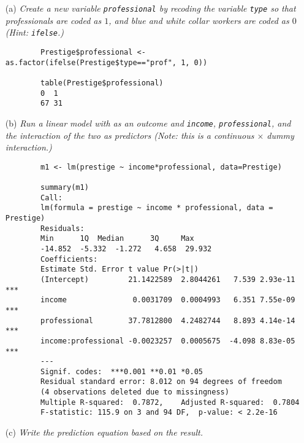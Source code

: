 \documentclass[12pt,letterpaper]{article}
\begin{document}
	\newpage
	\begin{enumerate}
		
		\item [(a)]
		\textit{Create a new variable \texttt{professional} by recoding the variable \texttt{type} so that professionals are coded as $1$, and blue and white collar workers are coded as $0$ (Hint: \texttt{ifelse}.)}
		
		
		\begin{verbatim}
		Prestige$professional <- as.factor(ifelse(Prestige$type=="prof", 1, 0))
		
		table(Prestige$professional)
		0  1 
		67 31 
		\end{verbatim}
		
				 		\vspace{1cm}
		
		\item [(b)]
		\textit{Run a linear model with  as an outcome and \texttt{income}, \texttt{professional}, and the interaction of the two as predictors (Note: this is a continuous $\times$ dummy interaction.)}
				 		\vspace{.25cm}
		\begin{verbatim}
		m1 <- lm(prestige ~ income*professional, data=Prestige)
		
		summary(m1)
		Call:
		lm(formula = prestige ~ income * professional, data = Prestige)
		Residuals:
		Min      1Q  Median      3Q     Max 
		-14.852  -5.332  -1.272   4.658  29.932 
		Coefficients:
		Estimate Std. Error t value Pr(>|t|)    
		(Intercept)         21.1422589  2.8044261   7.539 2.93e-11 ***
		income               0.0031709  0.0004993   6.351 7.55e-09 ***
		professional        37.7812800  4.2482744   8.893 4.14e-14 ***
		income:professional -0.0023257  0.0005675  -4.098 8.83e-05 ***
		---
		Signif. codes:  ***0.001 **0.01 *0.05
		Residual standard error: 8.012 on 94 degrees of freedom
		(4 observations deleted due to missingness)
		Multiple R-squared:  0.7872,	Adjusted R-squared:  0.7804 
		F-statistic: 115.9 on 3 and 94 DF,  p-value: < 2.2e-16
		\end{verbatim}
		\newpage
		\item [(c)]
		\textit{Write the prediction equation based on the result.}
		

\end{enumerate}
\end{document}
